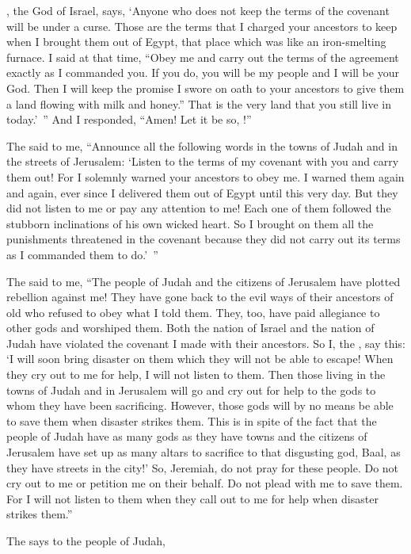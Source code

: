 {{},
the God
of Israel,
says,
‘Anyone
who
does not
keep the terms
of the covenant
will be under a curse.
Those are the terms that
I charged
your ancestors
to keep when
I brought
them out of Egypt,
that place which was like an iron-smelting furnace.
I said
at
that
time, “Obey
me and carry
out the terms of the agreement exactly
as I commanded
you. If you do, you will be my people
and I
will be
your God.
Then
I will keep
the promise
I swore on oath
to your ancestors
to give
them
a land
flowing
with milk
and honey.”
That is
the very land
that you
still live in today.’ ”
And I responded,
“Amen! Let it be so,
{}!”
\par }{\PP {}The
{}
said
to
me, “Announce
all
the following
words
in the towns
of Judah
and in the streets
of Jerusalem: ‘Listen
to the
terms
of my covenant
with you and carry them out!
For
I solemnly
warned
your ancestors
to obey
me.
I warned
them again and again,
ever since
I delivered
them out of Egypt
until
this
very day.
But they did not
listen
to me or
pay
any attention
to me! Each
one of them followed
the stubborn inclinations
of his own wicked
heart.
So I brought
on
them all
the punishments
threatened in the covenant
because they did not
carry out
its terms as I commanded
them to do.’ ”
\par }{\PP {}The
{}
said
to me,
“The people
of Judah
and the citizens
of Jerusalem
have
plotted rebellion against me!
They have gone back
to the evil ways
of their ancestors
of old
who
refused
to obey
what I told
them. They,
too, have paid allegiance
to other
gods
and worshiped
them. Both the nation
of Israel
and the nation
of Judah
have violated
the covenant
I made
with
their ancestors.
So
I,
the {}, say
this: ‘I will soon
bring
disaster
on them which
they will not
be able
to escape! When they cry
out to me
for help, I will not
listen
to them.
Then
those living
in the towns
of Judah
and in Jerusalem
will go and cry out
for help to
the gods
to whom
they
have been sacrificing.
However, those gods will by no
means be able to save
them when
disaster strikes them.
This
is in spite of the fact
that
the people of Judah
have as many
gods
as they have towns and the citizens of Jerusalem
have set
up as many
altars
to sacrifice
to that disgusting
god, Baal,
as they have streets
in the city!’
So, Jeremiah, do not
pray
for
these
people.
Do not
cry out
to me or petition
me on their behalf. Do not plead with me to save them. For
I will not
listen
to them when
they call out
to
me for
help when disaster strikes them.”
\par }{\PP {}The
{} says to the people of Judah,

}
